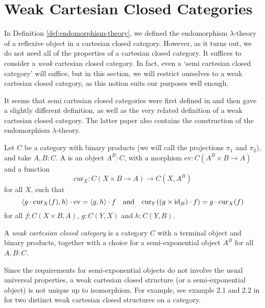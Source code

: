 \chapter{Weak Cartesian Closed Categories}\label{ch:weak-cartesian-closed-categories}
In Definition \ref{def:endomorphism-theory}, we defined the endomorphism $ \lambda $-theory of a reflexive object in a cartesian closed category. However, as it turns out, we do not need all of the properties of a cartesian closed category. It suffices to consider a \textit{weak} cartesian closed category. In fact, even a `semi cartesian closed category' will suffice, but in this section, we will restrict ourselves to a weak cartesian closed category, as this notion suits our purposes well enough.

It seems that semi cartesian closed categories were first defined in \autocite{hayashi-1985-semifunctors} and then \autocite{hoofman-1993-semi-cartesian-closed} gave a slightly different definition, as well as the very related definition of a weak cartesian closed category. The latter paper also contains the construction of the endomorphism $ \lambda $-theory.

\begin{definition}
  Let $ C $ be a category with binary products (we will call the projections $ \pi_1 $ and $ \pi_2 $), and take $ A, B : C $. A  is an object $ A^B : C $, with a morphism $ \mathrm{ev}: C(A^B \times B \to A) $ and a function
  \[ \mathrm{cur}_X: C(X \times B \to A) \to C(X, A^B) \]
  for all $ X $, such that
  \[ \langle g \cdot \mathrm{cur}_X(f), h \rangle \cdot \mathrm{ev} = \langle g, h \rangle \cdot f \quad \text{and} \quad \mathrm{cur}_Y((g \times \text{id}_{B}) \cdot f) = g \cdot \mathrm{cur}_X(f) \]
  for all $ f: C(X \times B, A) $, $ g : C(Y, X) $ and $ h : C(Y, B) $.
\end{definition}

\begin{definition}
  A \textit{weak cartesian closed category} is a category $ C $ with a terminal object and binary products, together with a choice for a semi-exponential object $ A^B $ for all $ A, B : C $.
\end{definition}

\begin{remark}
  Since the requirements for semi-exponential objects do not involve the usual universal properties, a weak cartesian closed structure (or a semi-exponential object) is not unique up to isomorphism. For example, see example 2.1 and 2.2 in \autocite{hoofman-1993-semi-cartesian-closed} for two distinct weak cartesian closed structures on a category.
\end{remark}

